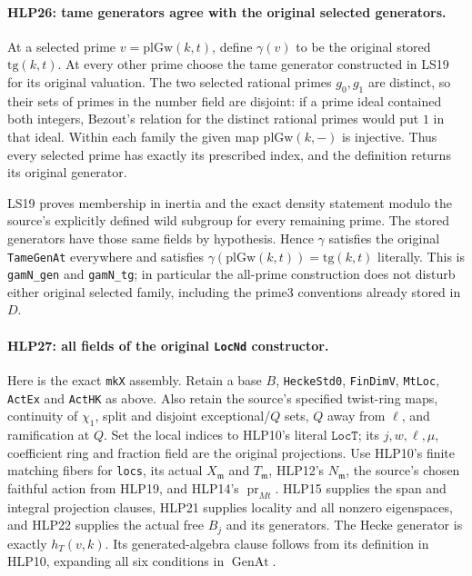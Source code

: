 \paragraph{HLP26: tame generators agree with the original selected generators.}
\label{claim:HLP26}
At a selected prime \(v=\mathrm{plGw}(k,t)\), define
\(\gamma(v)\) to be the original stored \(\mathrm{tg}(k,t)\).
At every other prime choose the tame generator constructed in
LS19 for its original valuation. The two selected rational primes
\(g_0,g_1\) are distinct, so their sets of primes in the number
field are disjoint: if a prime ideal contained both integers,
Bezout's relation for the distinct rational primes would put
\(1\) in that ideal. Within each family the given map
\(\mathrm{plGw}(k,-)\) is injective. Thus every selected prime
has exactly its prescribed index, and the definition returns its
original generator.

LS19 proves membership in inertia and the exact density statement
modulo the source's explicitly defined wild subgroup for every
remaining prime. The stored generators have those same fields
by hypothesis. Hence \(\gamma\) satisfies the original
\texttt{TameGenAt} everywhere and satisfies
\(\gamma(\mathrm{plGw}(k,t))=\mathrm{tg}(k,t)\) literally.
This is \texttt{gamN\_gen} and \texttt{gamN\_tg}; in particular the
all-prime construction does not disturb either original selected
family, including the prime3 conventions already stored in \(D\).

\paragraph{HLP27: all fields of the original \texttt{LocNd} constructor.}
\label{claim:HLP27}
Here is the exact \texttt{mkX} assembly. Retain a base \(B\),
\texttt{HeckeStd0}, \texttt{FinDimV}, \texttt{MtLoc},
\texttt{ActEx} and \texttt{ActHK} as above. Also retain the source's
specified twist-ring maps, continuity of \(\chi_1\), split and
disjoint exceptional/\(Q\) sets, \(Q\) away from \(\ell\), and
ramification at \(Q\). Set the local indices to HLP10's literal
\(\texttt{LocT}\); its \(j,w,\ell,\mu\), coefficient ring and
fraction field are the original projections. Use HLP10's finite
matching fibers for \texttt{locs}, its actual \(X_{\mathfrak m}\)
and \(T_{\mathfrak m}\), HLP12's \(N_{\mathfrak m}\), the source's
chosen faithful action from HLP19, and HLP14's
\(\operatorname{pr}_{Mt}\). HLP15 supplies the span and integral
projection clauses, HLP21 supplies locality and all nonzero
eigenspaces, and HLP22 supplies the actual free \(B_j\) and its
generators. The Hecke generator is exactly \(h_T(v,k)\).
Its generated-algebra clause follows from its definition in
HLP10, expanding all six conditions in \(\operatorname{GenAt}\).

